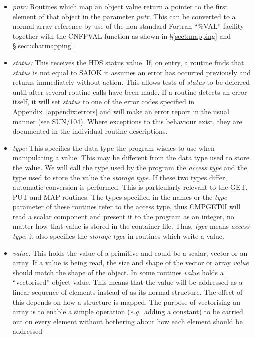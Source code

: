 \documentclass[twoside,11pt]{article}
\newcommand{\htmlref}[2]{#1}
\newcommand{\xref}[3]{#1}
\renewcommand{\_}{\texttt{\symbol{95}}}
\newcommand{\qt}[1]{``#1''}
\newcommand{\st}[1]{{\em{#1}}}
\newcommand{\qt}[1]{{\tt{"}}#1{\tt{"}}}
\begin{document}
\begin{itemize}
\item \st{pntr:}
Routines which map an object value return a pointer to the first
element of that object in the parameter \st{pntr}. This can be
converted to a normal array reference by use of the non-standard
Fortran \qt{\%VAL} facility together with the
\xref{CNF\_PVAL}{sun209}{CNF_PVAL} function as shown in
\S\ref{sect:mapping} and \S\ref{sect:charmapping}.

\item \st{status:}
This receives the HDS status value. If, on entry, a routine finds that
\st{status} is not equal to SAI\_\_OK it assumes an error has
occurred previously and returns immediately without action. This
allows tests of \st{status} to be deferred until after several
routine calls have been made. If a routine detects an error itself, it
will set \st{status} to one of the error codes specified in
Appendix~\ref{appendix:errors} and will make an error report in the
usual manner (see \xref{SUN/104}{sun104}{}). Where exceptions to this
behaviour exist, they are documented in the individual routine
descriptions.

\item \htmlref{\st{type:}}{sect:type}
This specifies the data type the program wishes to use when
manipulating a value. This may be different from the data type used to
store the value. We will call the type used by the program the
\st{access type} and the type used to store the value the \st{storage
type}. If these two types differ, automatic conversion is
performed. This is particularly relevant to the GET, PUT and MAP
routines. The types specified in the names or the \st{type} parameter
of these routines refer to the access type, thus
\htmlref{CMP\_GET0I}{CMP_GET0x} will read a scalar component and
present it to the program as an integer, no matter how that value is
stored in the container file. Thus, \st{type} means \st{access type};
it also specifies the \st{storage type} in routines which write a
value.

\item \st{value:}
This holds the value of a primitive and could be a scalar, vector or
an array.  If a value is being read, the size and shape of the vector
or array \st{value} should match the shape of the object. In some
routines \st{value} holds a \qt{vectorised} object value. This means
that the value will be addressed as a linear sequence of elements
instead of as its normal structure. The effect of this depends on how
a structure is mapped. The purpose of vectorising an array is to
enable a simple operation (\st{e.g.}\ adding a constant) to be carried
out on every element without bothering about how each element should
be addressed

\end{itemize}
\end{document}
